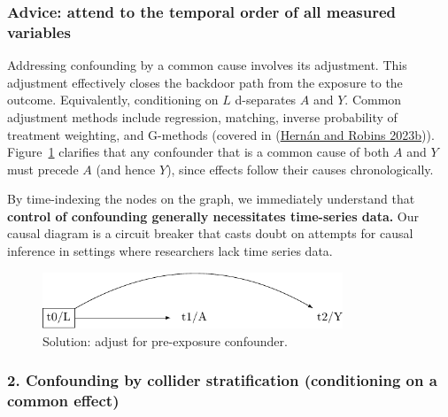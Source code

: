 \documentclass[
  singlecolumn]{article}
\begin{document}
\hypertarget{advice-attend-to-the-temporal-order-of-all-measured-variables}{%
\subsubsection{Advice: attend to the temporal order of all measured
variables}\label{advice-attend-to-the-temporal-order-of-all-measured-variables}}

Addressing confounding by a common cause involves its adjustment. This
adjustment effectively closes the backdoor path from the exposure to the
outcome. Equivalently, conditioning on \(L\) d-separates \(A\) and
\(Y\). Common adjustment methods include regression, matching, inverse
probability of treatment weighting, and G-methods (covered in
(\protect\hyperlink{ref-hernuxe1n2023a}{Hernán and Robins 2023b})).
Figure~\ref{fig-dag-common-cause-solution} clarifies that any confounder
that is a common cause of both \(A\) and \(Y\) must precede \(A\) (and
hence \(Y\)), since effects follow their causes chronologically.

By time-indexing the nodes on the graph, we immediately understand that
\textbf{control of confounding generally necessitates time-series data.}
Our causal diagram is a circuit breaker that casts doubt on attempts for
causal inference in settings where researchers lack time series data.

\begin{figure}

{\centering \includegraphics[width=0.8\textwidth,height=\textheight]{causal-dags_files/figure-pdf/fig-dag-common-cause-solution-1.pdf}

}

\caption{\label{fig-dag-common-cause-solution}Solution: adjust for
pre-exposure confounder.}

\end{figure}

\hypertarget{confounding-by-collider-stratification-conditioning-on-a-common-effect}{%
\subsubsection{2. Confounding by collider stratification (conditioning
on a common
effect)}\label{confounding-by-collider-stratification-conditioning-on-a-common-effect}}
\end{document}
